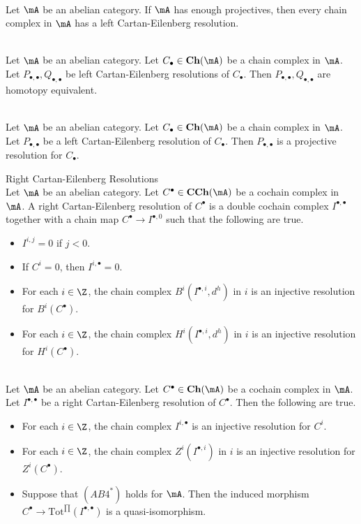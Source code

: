 \documentclass[a4paper]{article}
\begin{document}
\begin{lmm}{}{}\\
Let $\mA$ be an abelian category. If $\mA$ has enough projectives, then every chain complex in $\mA$ has a left Cartan-Eilenberg resolution. 
\end{lmm}

\begin{lmm}{}{}\\
Let $\mA$ be an abelian category. Let $C_\bullet\in\bold{Ch}(\mA)$ be a chain complex in $\mA$. Let $P_{\bullet,\bullet},Q_{\bullet,\bullet}$ be left Cartan-Eilenberg resolutions of $C_\bullet$. Then $P_{\bullet,\bullet},Q_{\bullet,\bullet}$ are homotopy equivalent. 
\end{lmm}

\begin{prp}{}{}\\
Let $\mA$ be an abelian category. Let $C_\bullet\in\bold{Ch}(\mA)$ be a chain complex in $\mA$. Let $P_{\bullet,\bullet}$ be a left Cartan-Eilenberg resolution of $C_\bullet$. Then $P_{\bullet,\bullet}$ is a projective resolution for $C_\bullet$. 
\end{prp}

\begin{defn}{Right Cartan-Eilenberg Resolutions}{}\\
Let $\mA$ be an abelian category. Let $C^\bullet\in\bold{CCh}(\mA)$ be a cochain complex in $\mA$. A right Cartan-Eilenberg resolution of $C^\bullet$ is a double cochain complex $I^{\bullet,\bullet}$ together with a chain map $C^\bullet\to I^{\bullet,0}$ such that the following are true. 
\begin{itemize}
\item $I^{i,j}=0$ if $j<0$. 
\item If $C^i=0$, then $I^{i,\bullet}=0$. 
\item For each $i\in\Z$, the chain complex $B^i(I^{\bullet,i},d^h)$ in $i$ is an injective resolution for $B^i(C^\bullet)$. 
\item For each $i\in\Z$, the chain complex $H^i(I^{\bullet,i},d^h)$ in $i$ is an injective resolution for $H^i(C^\bullet)$. 
\end{itemize}
\end{defn}

\begin{prp}{}{}\\
Let $\mA$ be an abelian category. Let $C^\bullet\in\bold{Ch}(\mA)$ be a cochain complex in $\mA$. Let $I^{\bullet,\bullet}$ be a right Cartan-Eilenberg resolution of $C^\bullet$. Then the following are true. 
\begin{itemize}
\item For each $i\in\Z$, the chain complex $I^{i,\bullet}$ is an injective resolution for $C^i$. 
\item For each $i\in\Z$, the chain complex $Z^i(I^{\bullet,i})$ in $i$ is an injective resolution for $Z^i(C^\bullet)$. 
\item Suppose that $(AB4^\ast)$ holds for $\mA$. Then the induced morphism $C^\bullet\to\text{Tot}^{\prod}(I^{\bullet,\bullet})$ is a quasi-isomorphism. 
\end{itemize}
\end{prp}
\end{document}
